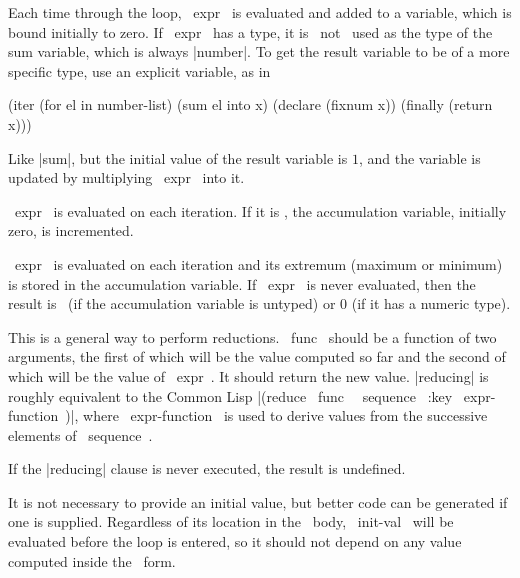 \begin{clauses}

Each time through the loop, ~expr~ is evaluated and added to a
variable, which is bound initially to zero.  If ~expr~ has a type,
it is ~not~ used as the type of the sum variable, which is always
|number|.  To get the result variable to be of a more specific
type, use an explicit variable, as in
\begin{program}
(iter (for el in number-list)
      (sum el into x)
      (declare (fixnum x))
      (finally (return x)))
\end{program}

Like |sum|, but the initial value of the result variable is $1$,
and the variable is updated by multiplying ~expr~ into it.

~expr~ is evaluated on each iteration.  If it is \nonnil, the
accumulation variable, initially zero, is incremented.

\startitem
{}
\finishitem
~expr~ is evaluated on each iteration and its extremum (maximum or
minimum) is stored in the accumulation variable.  If ~expr~ is never
evaluated, then the result is \nil\ (if the accumulation variable is
untyped) or $0$ (if it has a numeric type).

This is a general way to perform reductions. ~func~ should be a
function of two arguments, the first of which will be the value
computed so far and
the second of which will be the value of ~expr~.  It should return the
new value.
|reducing| is roughly equivalent to the
Common Lisp |(reduce ~func~ ~sequence~ :key ~expr-function~)|, where
~expr-function~ is used to derive values from the successive elements
of ~sequence~.

\cpar If the |reducing| clause is never executed, the result is
undefined.

\cpar It is not necessary to provide an
initial value, but better code can be generated if one is supplied.
Regardless of its location in the \iter\ body, ~init-val~ will be
evaluated before the loop is entered, so it should not depend on any
value computed inside the \iter\ form.  


\end{clauses}

